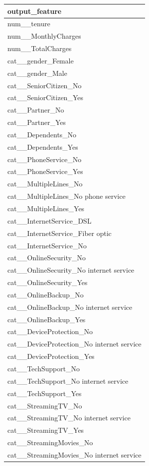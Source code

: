\begin{tabular}{l}
\toprule
output\_feature \\
\midrule
num\_\_tenure \\
num\_\_MonthlyCharges \\
num\_\_TotalCharges \\
cat\_\_gender\_Female \\
cat\_\_gender\_Male \\
cat\_\_SeniorCitizen\_No \\
cat\_\_SeniorCitizen\_Yes \\
cat\_\_Partner\_No \\
cat\_\_Partner\_Yes \\
cat\_\_Dependents\_No \\
cat\_\_Dependents\_Yes \\
cat\_\_PhoneService\_No \\
cat\_\_PhoneService\_Yes \\
cat\_\_MultipleLines\_No \\
cat\_\_MultipleLines\_No phone service \\
cat\_\_MultipleLines\_Yes \\
cat\_\_InternetService\_DSL \\
cat\_\_InternetService\_Fiber optic \\
cat\_\_InternetService\_No \\
cat\_\_OnlineSecurity\_No \\
cat\_\_OnlineSecurity\_No internet service \\
cat\_\_OnlineSecurity\_Yes \\
cat\_\_OnlineBackup\_No \\
cat\_\_OnlineBackup\_No internet service \\
cat\_\_OnlineBackup\_Yes \\
cat\_\_DeviceProtection\_No \\
cat\_\_DeviceProtection\_No internet service \\
cat\_\_DeviceProtection\_Yes \\
cat\_\_TechSupport\_No \\
cat\_\_TechSupport\_No internet service \\
cat\_\_TechSupport\_Yes \\
cat\_\_StreamingTV\_No \\
cat\_\_StreamingTV\_No internet service \\
cat\_\_StreamingTV\_Yes \\
cat\_\_StreamingMovies\_No \\
cat\_\_StreamingMovies\_No internet service \\

\end{tabular}
